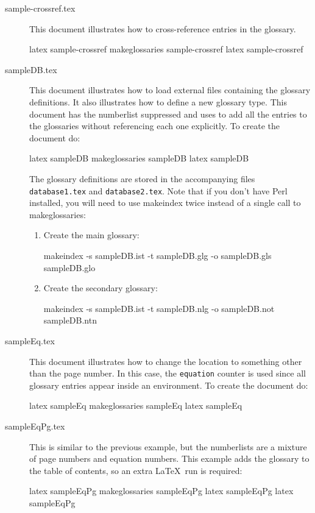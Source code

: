 \documentclass[report]{nlctdoc}
\begin{document}
\begin{description}
\item[sample-crossref.tex]\label{ex:sample-crossref}
This document illustrates how to cross-reference entries in the
glossary.
\begin{prompt}
latex sample-crossref
makeglossaries sample-crossref
latex sample-crossref
\end{prompt}

\item[sampleDB.tex]\label{ex:sampleDB} This document illustrates how
to load external files containing the glossary definitions. It also
illustrates how to define a new glossary type. This document has the
\gls{numberlist} suppressed and uses  to add all
the entries to the glossaries without referencing each one
explicitly. To create the document do:
\begin{prompt}
latex sampleDB
makeglossaries sampleDB
latex sampleDB
\end{prompt}
The glossary definitions are stored in the accompanying files
\texttt{database1.tex} and \texttt{database2.tex}. Note that if you
don't have Perl installed, you will need to use \gls{makeindex}
twice instead of a single call to \gls{makeglossaries}:
\begin{enumerate}
\item Create the main glossary:
\begin{prompt}
makeindex -s sampleDB.ist -t sampleDB.glg -o sampleDB.gls sampleDB.glo
\end{prompt}
\item Create the secondary glossary:
\begin{prompt}
makeindex -s sampleDB.ist -t sampleDB.nlg -o sampleDB.not sampleDB.ntn
\end{prompt}
\end{enumerate}

\item[sampleEq.tex]\label{ex:sampleEq} This document illustrates how
to change the location to something other than the page number. In
this case, the \texttt{equation} counter is used since all glossary
entries appear inside an  environment. To create
the document do:
\begin{prompt}
latex sampleEq
makeglossaries sampleEq
latex sampleEq
\end{prompt}

\item[sampleEqPg.tex]\label{ex:sampleEqPg} This is similar to the
previous example, but the \glspl{numberlist} are a
mixture of page numbers and equation numbers. This example adds the
glossary to the table of contents, so an extra \LaTeX\ run is
required:
\begin{prompt}
latex sampleEqPg
makeglossaries sampleEqPg
latex sampleEqPg
latex sampleEqPg
\end{prompt}


\end{description}
\end{document}
